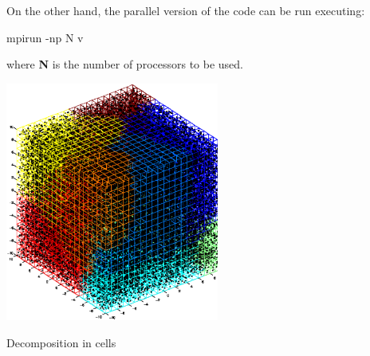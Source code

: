 On the other hand, the parallel version of the code can be run executing\+: \begin{DoxyVerb}mpirun -np N v
\end{DoxyVerb}
 where {\bfseries N} is the number of processors to be used.

 
\begin{DoxyImage}
\includegraphics[width=7cm]{cells_50k}
\caption{Decomposition in cells}
\end{DoxyImage}
 
